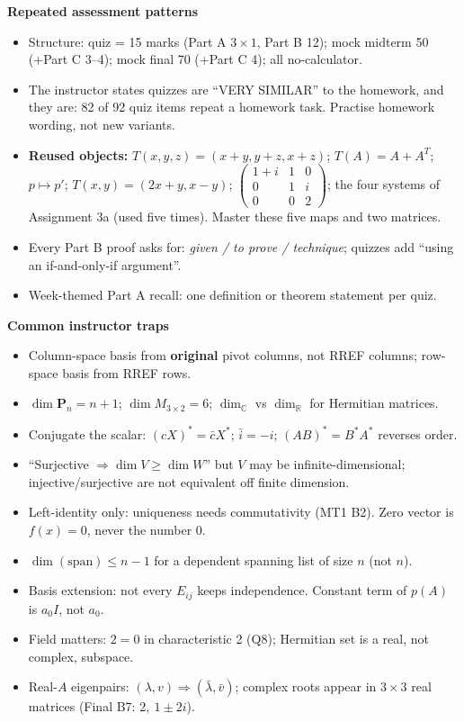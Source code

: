 \documentclass[9pt]{article}
\newcommand{\sub}[1]{\vspace{3pt}\par{\bfseries\color{NAVY}#1}\nopagebreak\par}
\begin{document}
\sub{Repeated assessment patterns}
\begin{itemize}[leftmargin=1.2em,itemsep=0pt,topsep=1pt]
\item Structure: quiz = 15 marks (Part A $3\times1$, Part B 12); mock midterm 50 (+Part C 3--4); mock final 70 (+Part C 4); all no-calculator.
\item The instructor states quizzes are ``VERY SIMILAR'' to the homework, and they are: 82 of 92 quiz items repeat a homework task. Practise homework wording, not new variants.
\item \textbf{Reused objects:} $T(x,y,z)=(x{+}y,y{+}z,x{+}z)$; $T(A)=A+A^T$; $p\mapsto p'$; $T(x,y)=(2x{+}y,x{-}y)$; $\begin{pmatrix}1{+}i&1&0\\0&1&i\\0&0&2\end{pmatrix}$; the four systems of Assignment 3a (used five times). Master these five maps and two matrices.
\item Every Part B proof asks for: \emph{given / to prove / technique}; quizzes add ``using an if-and-only-if argument''.
\item Week-themed Part A recall: one definition or theorem statement per quiz.
\end{itemize}
\sub{Common instructor traps}
\begin{itemize}[leftmargin=1.2em,itemsep=0pt,topsep=1pt]
\item Column-space basis from \textbf{original} pivot columns, not RREF columns; row-space basis from RREF rows.
\item $\dim\mathbf P_n=n+1$; $\dim M_{3\times2}=6$; $\dim_{\mathbb C}$ vs $\dim_{\mathbb R}$ for Hermitian matrices.
\item Conjugate the scalar: $(cX)^*=\bar cX^*$; $\bar i=-i$; $(AB)^*=B^*A^*$ reverses order.
\item ``Surjective $\Rightarrow\dim V\ge\dim W$'' but $V$ may be infinite-dimensional; injective/surjective are not equivalent off finite dimension.
\item Left-identity only: uniqueness needs commutativity (MT1 B2). Zero vector is $f(x)=0$, never the number $0$.
\item $\dim(\text{span})\le n-1$ for a dependent spanning list of size $n$ (not $n$).
\item Basis extension: not every $E_{ij}$ keeps independence. Constant term of $p(A)$ is $a_0I$, not $a_0$.
\item Field matters: $2=0$ in characteristic 2 (Q8); Hermitian set is a real, not complex, subspace.
\item Real-$A$ eigenpairs: $(\lambda,v)\Rightarrow(\bar\lambda,\bar v)$; complex roots appear in $3\times3$ real matrices (Final B7: $2,\ 1\pm2i$).
\end{itemize}
\end{document}
